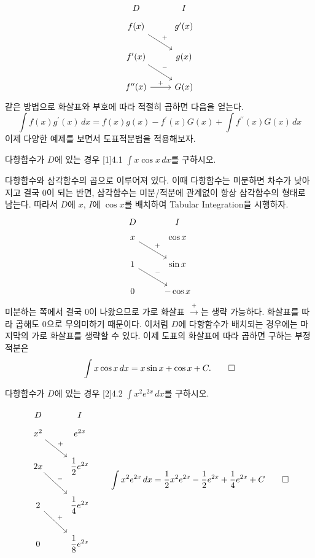 \documentclass{article}
\begin{document}
\[
	\begin{tikzcd}
		D & I \\[-12pt]
		f(x) \arrow[rd, "+"] & g^\prime(x) \\
		f^\prime(x) \arrow[rd, "-"] & g(x) \\
		f^{\prime\prime}(x) \arrow[r, "+"] & G(x)
	\end{tikzcd}
\]
같은 방법으로 화살표와 부호에 따라 적절히 곱하면 다음을 얻는다.
\[
	\int f(x)g^{\prime}(x)\,dx=f(x)g(x)-f^{\prime}(x)G(x)+\int f^{\prime\prime}(x)G(x)\,dx
\]
이제 다양한 예제를 보면서 도표적분법을 적용해보자.

\begin{exc}{다항함수가 $D$에 있는 경우 [1]}{4.1}
	$\displaystyle\int x\cos x\,dx$를 구하시오.
\end{exc}

\begin{sol}
	다항함수와 삼각함수의 곱으로 이루어져 있다. 이때 다항함수는 미분하면 차수가 낮아지고 결국 $0$이 되는 반면, 삼각함수는 미분/적분에 관계없이 항상 삼각함수의 형태로 남는다. 따라서 $D$에 $x$, $I$에 $\cos x$를 배치하여 Tabular Integration을 시행하자.
	\[
		\begin{tikzcd}
			D & I \\[-12pt]
			x \arrow[rd, "+"] & \cos x \\
			1 \arrow[rd, "-"] & \sin x \\
			0 & -\cos x
		\end{tikzcd}
	\]
	미분하는 쪽에서 결국 $0$이 나왔으므로 가로 화살표 $\xrightarrow{+}$는 생략 가능하다. 화살표를 따라 곱해도 $0$으로 무의미하기 때문이다. 이처럼 $D$에 다항함수가 배치되는 경우에는 마지막의 가로 화살표를 생략할 수 있다. 이제 도표의 화살표에 따라 곱하면 구하는 부정적분은
	\[
		\int x\cos x\,dx = x\sin x+\cos x +C.\qed
	\]
\end{sol}

\newpage
\begin{exc}{다항함수가 $D$에 있는 경우 [2]}{4.2}
	$\displaystyle\int x^2e^{2x}\,dx$를 구하시오.
\end{exc}

\begin{sol}
	\[
		\begin{tikzcd}
			D & I \\[-12pt]
			x^2 \arrow[rd, "+"] & e^{2x} \\
			2x \arrow[rd, "-"] & \dfrac{1}{2}e^{2x} \\
			2 \arrow[rd, "+"] & \dfrac{1}{4}e^{2x} \\
			0 & \dfrac{1}{8}e^{2x}
		\end{tikzcd}\qquad\int x^2e^{2x}\,dx=\frac{1}{2}x^2e^{2x}-\frac{1}{2}e^{2x}+\frac{1}{4}e^{2x}+C\qed
	\]
\end{sol}
\end{document}
